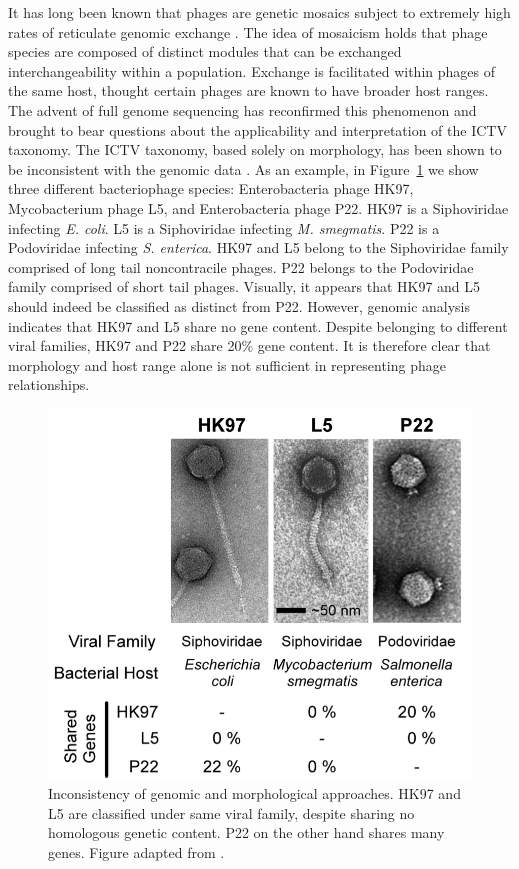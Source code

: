 It has long been known that phages are genetic mosaics subject to extremely high rates of reticulate genomic exchange \cite{Westmoreland:1969dd}.
The idea of mosaicism holds that phage species are composed of distinct modules that can be exchanged interchangeability within a population.
Exchange is facilitated within phages of the same host, thought certain phages are known to have broader host ranges.
The advent of full genome sequencing has reconfirmed this phenomenon and brought to bear questions about the applicability and interpretation of the ICTV taxonomy.
The ICTV taxonomy, based solely on morphology, has been shown to be inconsistent with the genomic data \cite{Lawrence:2002eg}.
As an example, in Figure~\ref{phage:fig:inconsistency} we show three different bacteriophage species: Enterobacteria phage HK97, Mycobacterium phage L5, and Enterobacteria phage P22.
HK97 is a Siphoviridae infecting \emph{E. coli}.
L5 is a Siphoviridae infecting \emph{M. smegmatis}.
P22 is a Podoviridae infecting \emph{S. enterica}.
HK97 and L5 belong to the Siphoviridae family comprised of long tail noncontracile phages.
P22 belongs to the Podoviridae family comprised of short tail phages.
Visually, it appears that HK97 and L5 should indeed be classified as distinct from P22.
However, genomic analysis indicates that HK97 and L5 share no gene content.
Despite belonging to different viral families, HK97 and P22 share 20\% gene content.
It is therefore clear that morphology and host range alone is not sufficient in representing phage relationships.

\begin{figure}
\centering
\includegraphics[width=.5\linewidth]{./fig/phage/LAWRENCE_phage_comparative.png}
\caption[Inconsistency of morphological classification in bacteriophage.]{Inconsistency of genomic and morphological approaches. HK97 and L5 are classified under same viral family, despite sharing no homologous genetic content. P22 on the other hand shares many genes. Figure adapted from \parencite{Lawrence:2002eg}.}
\label{phage:fig:inconsistency}
\end{figure}

